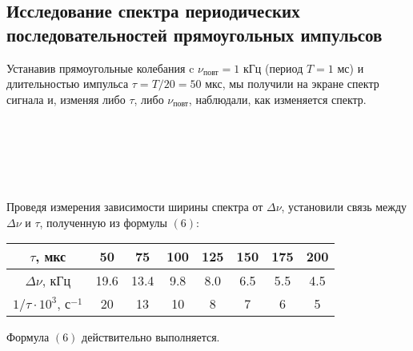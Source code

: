 \documentclass[a4paper,11pt]{extarticle}
\begin{document}
\subsection*{Исследование спектра периодических последовательностей прямоугольных импульсов}
Устанавив прямоугольные колебания c $\nu_{\text{повт}} = 1$ кГц (период $T = 1$ мс) и длительностью импульса $\tau = T/20 = 50$ мкс, мы получили на экране спектр сигнала и, изменяя либо $\tau$, либо $\nu_{\text{повт}}$, наблюдали, как изменяется спектр.
\begin{figure}[H]
    \centering
    \\
    \end{figure}
\begin{figure}[H]
    \centering
    \\
    \end{figure}
\begin{figure}[H]
    \centering
    \\
    \end{figure}
\begin{figure}[H]
    \centering
\end{figure}
\n
Проведя измерения зависимости ширины спектра от $\Delta \nu$, установили связь между $\Delta \nu$ и $\tau$, полученную из формулы $(6)$:
\begin{center}
\begin{tabular}{|c|c|c|c|c|c|c|c|}
\hline
$\tau$, мкс & 50 & 75 & 100 & 125 & 150 & 175 & 200 \\ \hline
$\Delta \nu$, кГц & 19.6 & 13.4 & 9.8 & 8.0 & 6.5 & 5.5 & 4.5 \\ \hline
$1/\tau \cdot 10^3$, с$^{-1}$ & 20 & 13 & 10 & 8 & 7 & 6 & 5 \\ \hline
\end{tabular}
\end{center}
\begin{center}
\end{center}
Формула $(6)$ действительно выполняется.
\end{document}
